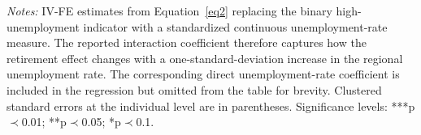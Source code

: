 \documentclass[arguments, manuscript, 11pt]{aastex631}
\begin{document}
\newpage
\begin{table}[h]
\centering
\caption{Robustness to continuous crisis exposure}
\label{tabB5}
\tiny{{\singlespacing \emph{Notes:} IV-FE estimates from Equation~\ref{eq2} replacing the binary high-unemployment indicator with a standardized continuous unemployment-rate measure. The reported interaction coefficient therefore captures how the retirement effect changes with a one-standard-deviation increase in the regional unemployment rate. The corresponding direct unemployment-rate coefficient is included in the regression but omitted from the table for brevity. Clustered standard errors at the individual level are in parentheses. Significance levels: ***p$\prec$0.01; **p$\prec$0.05; *p$\prec$0.1.}}
\end{table}
\end{document}
